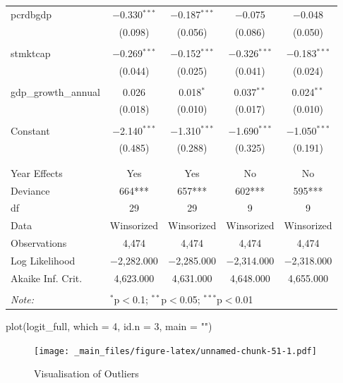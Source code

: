 \documentclass[a4paper,nobind]{templates/ociamthesis}
\newenvironment{Shaded}{\begin{snugshade}}{\end{snugshade}}
\newcommand{\AttributeTok}[1]{\textcolor[rgb]{0.77,0.63,0.00}{#1}}
\newcommand{\DecValTok}[1]{\textcolor[rgb]{0.00,0.00,0.81}{#1}}
\newcommand{\FunctionTok}[1]{\textcolor[rgb]{0.00,0.00,0.00}{#1}}
\newcommand{\NormalTok}[1]{#1}
\newcommand{\StringTok}[1]{\textcolor[rgb]{0.31,0.60,0.02}{#1}}
\renewenvironment{Shaded}
{
  \vspace{10pt}%
  \begin{snugshade}%
}{%
  \end{snugshade}%
  \vspace{8pt}%
}
\begin{document}
\begin{table}[!htbp]
\begin{tabular}{@{\extracolsep{5pt}}lcccc}
 pcrdbgdp & $-$0.330$^{***}$ & $-$0.187$^{***}$ & $-$0.075 & $-$0.048 \\ 
  & (0.098) & (0.056) & (0.086) & (0.050) \\ 
  & & & & \\ 
 stmktcap & $-$0.269$^{***}$ & $-$0.152$^{***}$ & $-$0.326$^{***}$ & $-$0.183$^{***}$ \\ 
  & (0.044) & (0.025) & (0.041) & (0.024) \\ 
  & & & & \\ 
 gdp\_growth\_annual & 0.026 & 0.018$^{*}$ & 0.037$^{**}$ & 0.024$^{**}$ \\ 
  & (0.018) & (0.010) & (0.017) & (0.010) \\ 
  & & & & \\ 
 Constant & $-$2.140$^{***}$ & $-$1.310$^{***}$ & $-$1.690$^{***}$ & $-$1.050$^{***}$ \\ 
  & (0.485) & (0.288) & (0.325) & (0.191) \\ 
  & & & & \\ 
\hline \\[-1.8ex] 
Year Effects & Yes & Yes & No & No \\ 
Deviance & 664*** & 657*** & 602*** & 595*** \\ 
df & 29 & 29 & 9 & 9 \\ 
Data & Winsorized & Winsorized & Winsorized & Winsorized \\ 
Observations & 4,474 & 4,474 & 4,474 & 4,474 \\ 
Log Likelihood & $-$2,282.000 & $-$2,285.000 & $-$2,314.000 & $-$2,318.000 \\ 
Akaike Inf. Crit. & 4,623.000 & 4,631.000 & 4,648.000 & 4,655.000 \\ 
\hline 
\hline \\[-1.8ex] 
\textit{Note:}  & \multicolumn{4}{l}{$^{*}$p$<$0.1; $^{**}$p$<$0.05; $^{***}$p$<$0.01} \\ 
\end{tabular} 
\end{table}

\begin{landscape}

\begin{Shaded}
\begin{Highlighting}[]
\FunctionTok{plot}\NormalTok{(logit\_full, }\AttributeTok{which =} \DecValTok{4}\NormalTok{, }\AttributeTok{id.n =} \DecValTok{3}\NormalTok{, }\AttributeTok{main =} \StringTok{""}\NormalTok{)}
\end{Highlighting}
\end{Shaded}

\begin{figure}
\centering
\texttt{[image: \_main\_files/figure-latex/unnamed-chunk-51-1.pdf]}
\caption{\label{fig:unnamed-chunk-51}Visualisation of Outliers}
\end{figure}

\end{landscape}
\end{document}
